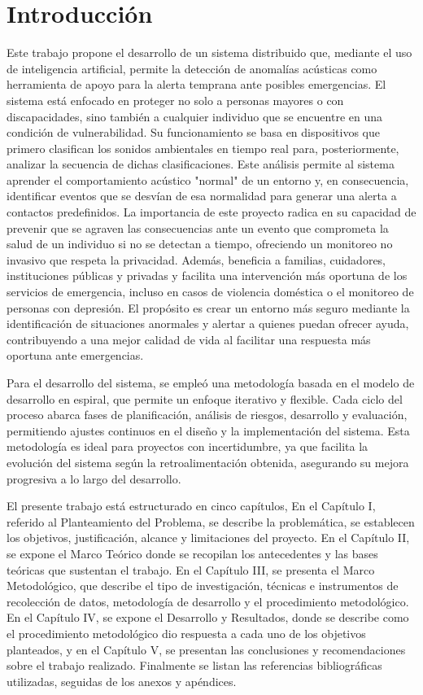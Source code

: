 \section{Introducción}

Este trabajo propone el desarrollo de un sistema distribuido que, mediante el uso de inteligencia artificial, permite la detección de anomalías acústicas como herramienta de apoyo para la alerta temprana ante posibles emergencias. El sistema está enfocado en proteger no solo a personas mayores o con discapacidades, sino también a cualquier individuo que se encuentre en una condición de vulnerabilidad. Su funcionamiento se basa en dispositivos que primero clasifican los sonidos ambientales en tiempo real para, posteriormente, analizar la secuencia de dichas clasificaciones. Este análisis permite al sistema aprender el comportamiento acústico "normal" de un entorno y, en consecuencia, identificar eventos que se desvían de esa normalidad para generar una alerta a contactos predefinidos. La importancia de este proyecto radica en su capacidad de prevenir que se agraven las consecuencias ante un evento que comprometa la salud de un individuo si no se detectan a tiempo, ofreciendo un monitoreo no invasivo que respeta la privacidad. Además, beneficia a familias, cuidadores, instituciones públicas y privadas y facilita una intervención más oportuna de los servicios de emergencia, incluso en casos de violencia doméstica o el monitoreo de personas con depresión. El propósito es crear un entorno más seguro mediante la identificación de situaciones anormales y alertar a quienes puedan ofrecer ayuda, contribuyendo a una mejor calidad de vida al facilitar una respuesta más oportuna ante emergencias.

Para el desarrollo del sistema, se empleó una metodología basada en el modelo de desarrollo en espiral, que permite un enfoque iterativo y flexible. Cada ciclo del proceso abarca fases de planificación, análisis de riesgos, desarrollo y evaluación, permitiendo ajustes continuos en el diseño y la implementación del sistema. Esta metodología es ideal para proyectos con incertidumbre, ya que facilita la evolución del sistema según la retroalimentación obtenida, asegurando su mejora progresiva a lo largo del desarrollo.

El presente trabajo está estructurado en cinco capítulos, En el Capítulo I, referido al Planteamiento del Problema, se describe la problemática, se establecen los objetivos, justificación, alcance y limitaciones del proyecto. En el Capítulo II, se expone el Marco Teórico donde se recopilan los antecedentes y las bases teóricas que sustentan el trabajo. En el Capítulo III, se presenta el Marco Metodológico, que describe el tipo de investigación, técnicas e instrumentos de recolección de datos, metodología de desarrollo y el procedimiento metodológico. En el Capítulo IV, se expone el Desarrollo y Resultados, donde se describe como el procedimiento metodológico dio respuesta a cada uno de los objetivos planteados, y en el Capítulo V, se presentan las conclusiones y recomendaciones sobre el trabajo realizado. Finalmente se listan las referencias bibliográficas utilizadas, seguidas de los anexos y apéndices.
